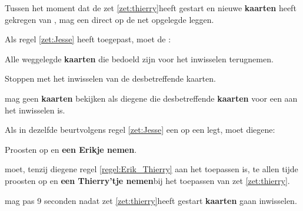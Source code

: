\vervolgLijst{}
\item \label{zet:Jesse} Tussen het moment dat de \huidigeSpeler zet \ref{zet:thierry}\footnotemark[1] heeft gestart en nieuwe \textbf{kaarten} heeft gekregen van \FritsN, mag \eenSpeler een \footnotemark[4] direct op de net opgelegde \footnotemark[5] leggen.
\eindLijst{}

\vervolgLijst{}
\item \label{zet:Jesse_2} Als \eenSpeler regel \ref{zet:Jesse} heeft toegepast, moet de \huidigeSpelerN:
\puntLijst{}
\item Alle weggelegde \textbf{kaarten} die bedoeld zijn voor het inwisselen terugnemen.
\item Stoppen met het inwisselen van de desbetreffende kaarten.
\eindPuntLijst{}
\eindLijst{}

\vervolgLijst{}
\item \Frits mag geen \textbf{kaarten} bekijken als diegene die desbetreffende \textbf{kaarten} voor een \andereSpeler aan het inwisselen is.
\eindLijst{}

\vervolgLijst{}
\item \label{regel:Erik_Thierry} Als \eenSpeler in dezelfde beurt\footnotemark[6] volgens regel \ref{zet:Jesse} een \footnotemark[4] op een \footnotemark[5] legt, moet diegene:
\puntLijst{}
\item Proosten op  en \textbf{een Erikje nemen}\footnotemark[7].
\eindPuntLijst{}
\eindLijst{}

\vervolgLijst{}
\item \label{regel:Erik_Thierry_2} \EenSpeler moet, tenzij diegene regel \ref{regel:Erik_Thierry} aan het toepassen is, te allen tijde proosten op  en \textbf{een Thierry'tje nemen}\footnotemark[6] bij het toepassen van zet \ref{zet:thierry}\footnotemark[1].
\eindLijst{}


\vervolgLijst{}
\item \Frits mag pas 9 seconden nadat \eenSpeler zet \ref{zet:thierry}\footnotemark[1] heeft gestart \textbf{kaarten} gaan inwisselen.
\eindLijst{}


